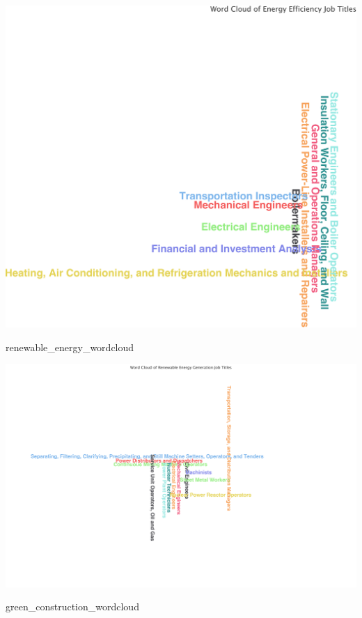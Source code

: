 \documentclass[
  letterpaper,
  DIV=11,
  numbers=noendperiod]{scrartcl}
\newenvironment{Shaded}{\begin{snugshade}}{\end{snugshade}}
\newcommand{\NormalTok}[1]{\textcolor[rgb]{0.00,0.23,0.31}{#1}}
\begin{document}
\includegraphics{index_files/figure-pdf/unnamed-chunk-17-1.pdf}

\begin{Shaded}
\begin{Highlighting}[]
\NormalTok{renewable\_energy\_wordcloud}
\end{Highlighting}
\end{Shaded}

\includegraphics{index_files/figure-pdf/unnamed-chunk-17-2.pdf}

\begin{Shaded}
\begin{Highlighting}[]
\NormalTok{green\_construction\_wordcloud}
\end{Highlighting}
\end{Shaded}
\end{document}
